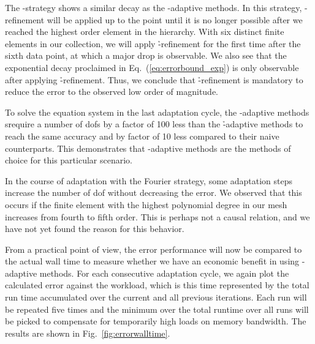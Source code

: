 The \p-strategy shows a similar decay as the \hp-adaptive methods.%
In this strategy, \p-refinement will be applied up to the point until it is no longer possible after we reached the highest order element in the hierarchy. With six distinct finite elements in our collection, we will apply \h-refinement for the first time after the sixth data point, at which a major drop is observable. We also see that the exponential decay proclaimed in Eq.~(\ref{eq:errorbound_exp}) is only observable after applying \h-refinement. Thus, we conclude that \h-refinement is mandatory to reduce the error to the observed low order of magnitude.

To solve the equation system in the last adaptation cycle, the \hp-adaptive methods %
srequire a number of \glspl{dof} by a factor of 100 less than the \h-adaptive methods to reach the same accuracy
and by factor of 10 less compared to their naive counterparts. This demonstrates that \hp-adaptive methods are the methods of choice for this particular scenario.


In the course of adaptation with the Fourier strategy, some adaptation steps increase the number of \gls{dof} without decreasing the error.
We observed that this occurs if the finite element with the highest polynomial degree in our mesh increases from fourth to fifth order. This is perhaps not a causal relation, and we have not yet found the reason for this behavior.





From a practical point of view, the error performance will now be compared to the actual wall time to measure whether we have an economic benefit in using \hp-adaptive methods. For each consecutive adaptation cycle, we again plot the calculated error against the workload, which is this time represented by the total run time accumulated over the current and all previous iterations. Each run will be repeated five times and the minimum over the total runtime over all runs will be picked to compensate for temporarily high loads on memory bandwidth. The results are shown in Fig.~\ref{fig:errorwalltime}.

